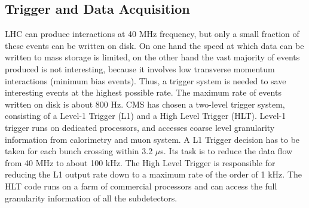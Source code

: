 \subsection*{Trigger and Data Acquisition}
LHC can produce interactions at 40 MHz frequency, but only a small fraction of these
events can be written on disk. On one hand the speed at which data can be written
to mass storage is limited, on the other hand the vast majority of events produced is
not interesting, because it involves low transverse momentum interactions (minimum bias
events). Thus, a trigger system is needed to save interesting events at the highest possible
rate. The maximum rate of events written on disk is about 800 Hz. CMS has chosen a
two-level trigger system, consisting of a Level-1 Trigger (L1)  and a High Level Trigger
(HLT).
Level-1 trigger runs on dedicated processors, and accesses coarse level granularity information 
from calorimetry and muon system. A L1 Trigger decision has to be taken for
each bunch crossing within 3.2 $\mu$s. Its task is to reduce the data flow from 40 MHz to
about 100 kHz. The High Level Trigger is responsible for reducing the L1 output rate down to a maximum
rate of the order of 1 kHz. The HLT code runs on a farm of commercial processors and can access the full granularity information of all the subdetectors.

